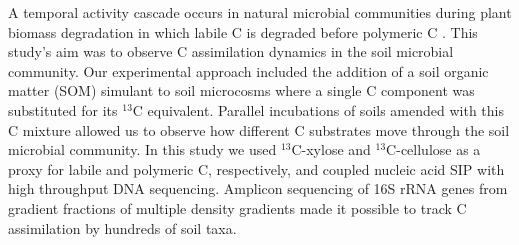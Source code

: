 A temporal activity cascade occurs in natural microbial communities during
plant biomass degradation in which labile C is degraded before polymeric
C \citep{Hu_1997,Rui_2009}. This study's aim was to observe C assimilation
dynamics in the soil microbial community. Our experimental approach
included the addition of a soil organic matter (SOM) simulant to soil
microcosms where a single C component was substituted for its $^{13}$C
equivalent. Parallel incubations of soils amended with this C mixture allowed
us to observe how different C substrates move through the soil microbial
community. In this study we used $^{13}$C-xylose and $^{13}$C-cellulose as
a proxy for labile and polymeric C, respectively, and coupled nucleic acid SIP
with high throughput DNA sequencing. Amplicon sequencing of 16S rRNA genes from
gradient fractions of multiple density gradients made it possible to track
C assimilation by hundreds of soil taxa.
